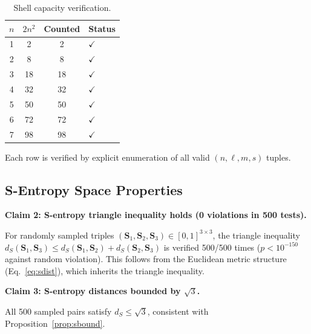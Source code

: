 \documentclass[10pt,twocolumn]{article}
\theoremstyle{remark}
\newcommand{\Scoord}{\mathbf{S}}
\newcommand{\dS}{d_S}
\begin{document}
\begin{table}[h]
\centering
\caption{Shell capacity verification.}
\label{tab:capacity}
\begin{tabular}{@{}cccl@{}}
\toprule
$n$ & $2n^2$ & Counted & Status \\
\midrule
1 & 2 & 2 & $\checkmark$ \\
2 & 8 & 8 & $\checkmark$ \\
3 & 18 & 18 & $\checkmark$ \\
4 & 32 & 32 & $\checkmark$ \\
5 & 50 & 50 & $\checkmark$ \\
6 & 72 & 72 & $\checkmark$ \\
7 & 98 & 98 & $\checkmark$ \\
\bottomrule
\end{tabular}
\end{table}

Each row is verified by explicit enumeration of all valid $(n, \ell, m, s)$ tuples.

\subsection{S-Entropy Space Properties}

\noindent\textbf{Claim 2: S-entropy triangle inequality holds (0 violations in 500 tests).}

For randomly sampled triples $(\Scoord_1, \Scoord_2, \Scoord_3) \in [0,1]^{3 \times 3}$, the triangle inequality $\dS(\Scoord_1, \Scoord_3) \leq \dS(\Scoord_1, \Scoord_2) + \dS(\Scoord_2, \Scoord_3)$ is verified 500/500 times ($p < 10^{-150}$ against random violation). This follows from the Euclidean metric structure (Eq.~\ref{eq:sdist}), which inherits the triangle inequality.

\medskip
\noindent\textbf{Claim 3: S-entropy distances bounded by $\sqrt{3}$.}

All 500 sampled pairs satisfy $\dS \leq \sqrt{3}$, consistent with Proposition~\ref{prop:sbound}.
\end{document}

